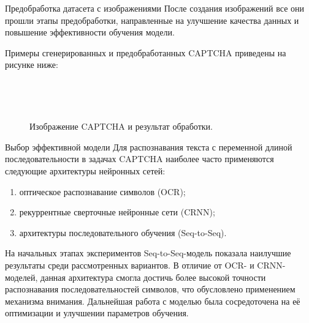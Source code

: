 \documentclass[12pt,a4paper,mathserif]{beamer}
\begin{document}
\begin{frame}{Предобработка датасета с изображениями}
    \setlength{\parindent}{0.5cm}
    После создания изображений все они прошли этапы предобработки, направленные на улучшение качества данных и повышение эффективности обучения модели.

    Примеры сгенерированных и предобработанных CAPTCHA приведены на рисунке ниже:

    \begin{figure}[H]
        \centering
        \begin{minipage}[h]{0.45\linewidth}
             \\
        \end{minipage}
        \begin{minipage}[h]{0.45\linewidth}
             \\
        \end{minipage}
        \caption{Изображение CAPTCHA и результат обработки.}
        \label{fig:example-captcha}
    \end{figure}
\end{frame}

\begin{frame}{Выбор эффективной модели}
    \setlength{\parindent}{0.5cm}
    Для распознавания текста с переменной длиной последовательности в задачах CAPTCHA наиболее часто применяются следующие архитектуры нейронных сетей:

    \begin{enumerate}
        \item оптическое распознавание символов (OCR);
        \item рекуррентные сверточные нейронные сети (CRNN);
        \item архитектуры последовательного обучения (Seq-to-Seq).
    \end{enumerate}
    
    На начальных этапах экспериментов Seq-to-Seq-модель показала наилучшие результаты среди рассмотренных вариантов. В отличие от OCR- и CRNN-моделей, данная архитектура смогла достичь более высокой точности распознавания последовательностей символов, что обусловлено применением механизма внимания. Дальнейшая работа с моделью была сосредоточена на её оптимизации и улучшении параметров обучения.
\end{frame}
\end{document}

